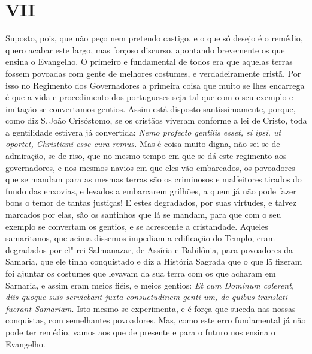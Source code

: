 \section{VII}

Suposto, pois, que não peço nem pretendo castigo, e o que só desejo é o
remédio, quero acabar este largo, mas forçoso discurso, apontando
brevemente os que ensina o Evangelho. O primeiro e fundamental de todos
era que aquelas terras fossem povoadas com gente de melhores costumes, e
verdadeiramente cristã. Por isso no Regimento dos Governadores a
primeira coisa que muito se lhes encarrega é que a vida e procedimento
dos portugueses seja tal que com o seu exemplo e imitação se convertamos
gentios.
Assim está disposto santissimamente, porque, como diz S.\,João
Crisóstomo, se os cristãos viveram conforme a lei de Cristo, toda a
gentilidade estivera já convertida: \emph{Nemo profecto gentilis esset,
si ipsi, ut oportet, Christiani esse cura remus.} Mas é coisa muito
digna, não sei se de admiração, se de riso, que no mesmo tempo em que se
dá este regimento aos governadores, e nos mesmos navios em que eles vão
embareados, os povoadores que se mandam para as mesmas terras são os
criminosos e malfeitores tirados do fundo das enxovias, e levados a
embarcarem grilhões, a quem já não pode fazer bons o temor de tantas
justiças! E estes degradados, por suas virtudes, e talvez marcados por
elas, são os santinhos que lá se mandam, para que com o seu exemplo se
convertam os gentios, e se acrescente a cristandade. Aqueles
samaritanos, que acima dissemos impediam a edificação do Templo, eram
degradados por el"-rei Salmanazar, de Assíria e Babilônia, para
povoadores da Samaria, que ele tinha conquistado e diz a História
Sagrada que o que lã fizeram foi ajuntar os costumes que levavam da sua
terra com os que acharam em Sarnaria, e assim eram meios fiéis, e meios
gentios: \emph{Et cum Dominum colerent, diis quoque suis serviebant
juxta consuetudinem genti um, de quibus translati fuerant Samariam}.
Isto mesmo se experimenta, e é força que suceda nas nossas
conquistas, com semelhantes povoadores. Mas, como este erro fundamental
já não pode ter remédio, vamos aos que de presente e para o futuro nos
ensina o Evangelho.

